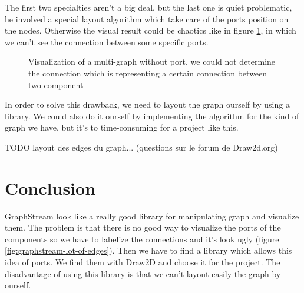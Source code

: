 The first two specialties aren't a big deal, but the last one is quiet
problematic, he involved a special layout algorithm which take care of the ports
position on the nodes. Otherwise the visual result could be chaotics like in
figure \ref{fig:multigraph-no-port}, in which we can't see the connection
between some specific ports.

\begin{figure}[H]
  \centering
  \caption[Visualization of a multi-graph without port]{Visualization of a
    multi-graph without port, we could not determine the connection which is
    representing a certain connection between two component}
  \label{fig:multigraph-no-port}
\end{figure}

In order to solve this drawback, we need to layout the graph ourself by using a
library. We could also do it ourself by implementing the algorithm for the kind
of graph we have, but it's to time-consuming for a project like this.

TODO layout des edges du graph... (questions sur le forum de Draw2d.org)

\section{Conclusion}
\label{sec:viewing-library-conclusion}

GraphStream look like a really good library for manipulating graph and visualize
them. The problem is that there is no good way to visualize the ports of the
components so we have to labelize the connections and it's look ugly (figure
\ref{fig:graphstream-lot-of-edges}). Then we have to find a library which allows
this idea of ports. We find them with Draw2D and choose it for the project. The
disadvantage of using this library is that we can't layout easily the graph by
ourself.
